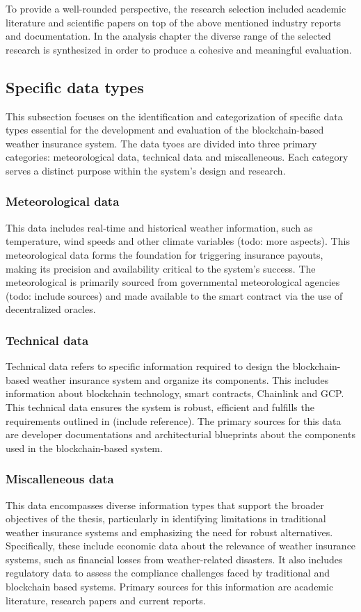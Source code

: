 To provide a well-rounded perspective, the research selection included academic literature and scientific papers on top of the above mentioned industry reports and documentation. In the analysis chapter the diverse range of the selected research is synthesized in order to produce a cohesive and meaningful evaluation.

\subsection{Specific data types}
This subsection focuses on the identification and categorization of specific data types essential for the development and evaluation of the blockchain-based weather insurance system. The data tyoes are divided into three primary categories: meteorological data, technical data and miscalleneous. Each category serves a distinct purpose within the system's design and research. 

\subsubsection{Meteorological data}
This data includes real-time and historical weather information, such as temperature, wind speeds and other climate variables (todo: more aspects). This meteorological data forms the foundation for triggering insurance payouts, making its precision and availability critical to the system's success. The meteorological is primarily sourced from governmental meteorological agencies (todo: include sources) and made available to the smart contract via the use of decentralized oracles.

\subsubsection{Technical data}
Technical data refers to specific information required to design the blockchain-based weather insurance system and organize its components. This includes information about blockchain technology, smart contracts, Chainlink and GCP. This technical data ensures the system is robust, efficient and fulfills the requirements outlined in (include reference). The primary sources for this data are developer documentations and architecturial blueprints about the components used in the blockchain-based system. 

\subsubsection{Miscalleneous data}
This data encompasses diverse information types that support the broader objectives of the thesis, particularly in identifying limitations in traditional weather insurance systems and emphasizing the need for robust alternatives. Specifically, these include economic data about the relevance of weather insurance systems, such as financial losses from weather-related disasters. It also includes regulatory data to assess the compliance challenges faced by traditional and blockchain based systems. Primary sources for this information are academic literature, research papers and current reports.

